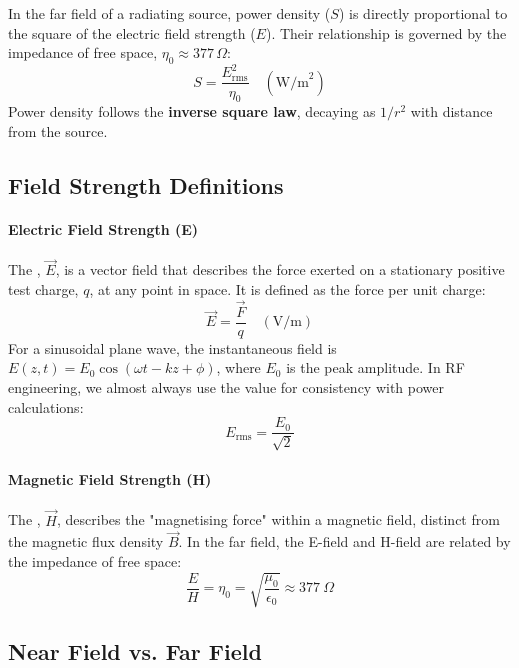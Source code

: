 \begin{keyconcept}
    In the far field of a radiating source, power density ($S$) is directly proportional to the square of the electric field strength ($E$). Their relationship is governed by the impedance of free space, $\eta_0 \approx 377\,\Omega$:
    \[
        S = \frac{E_{\text{rms}}^2}{\eta_0} \quad (\text{W/m}^2)
    \]
    Power density follows the \textbf{inverse square law}, decaying as $1/r^2$ with distance from the source.
\end{keyconcept}

\subsection{Field Strength Definitions}

\paragraph{Electric Field Strength (E)}
The , $\vec{E}$, is a vector field that describes the force exerted on a stationary positive test charge, $q$, at any point in space. It is defined as the force per unit charge:
\begin{equation}
    \vec{E} = \frac{\vec{F}}{q} \quad (\text{V/m})
\end{equation}
For a sinusoidal plane wave, the instantaneous field is $E(z,t) = E_0 \cos(\omega t - kz + \phi)$, where $E_0$ is the peak amplitude. In RF engineering, we almost always use the  value for consistency with power calculations:
\begin{equation}
    E_{\text{rms}} = \frac{E_0}{\sqrt{2}}
\end{equation}

\paragraph{Magnetic Field Strength (H)}
The , $\vec{H}$, describes the "magnetising force" within a magnetic field, distinct from the magnetic flux density $\vec{B}$. In the far field, the E-field and H-field are related by the impedance of free space:
\begin{equation}
    \frac{E}{H} = \eta_0 = \sqrt{\frac{\mu_0}{\epsilon_0}} \approx 377~\Omega
\end{equation}

\subsection{Near Field vs. Far Field}

